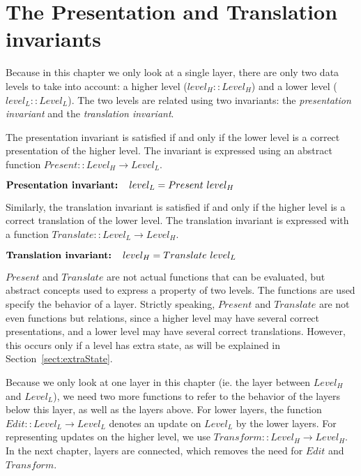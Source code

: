 %																
%																
%																
\section{The Presentation and Translation invariants}


Because in this chapter we only look at a single layer, there are only two data levels to take into account: a higher level ($level_{H} :: Level_{H}$) and a lower level ($level_{L} :: Level_{L}$). The two levels are related using two invariants: the {\em presentation invariant} and the {\em translation invariant}. 

The presentation invariant is satisfied if and only if the lower level is a correct presentation of the higher level. The invariant is expressed using an abstract function 
$Present ::  Level_{H} \rightarrow Level_{L}$.

\begin{small}\begin{math}
\text{\bf Presentation invariant:~~~} level_{L} = Present~level_{H}\\
\end{math}\end{small}

Similarly, the translation invariant is satisfied if and only if the higher level is a correct translation of the lower level. The translation invariant is expressed with a function 
$Translate ::  Level_{L} \rightarrow Level_{H}$.

\begin{small}\begin{math}
\text{\bf Translation invariant:~~~} level_{H} = Translate~level_{L}\\
\end{math}\end{small}

$Present$ and $Translate$ are not actual functions that can be evaluated, but abstract concepts used to express a property of two levels. The functions are used specify the behavior of a layer.
Strictly speaking, $Present$ and $Translate$ are not even functions but relations, since a higher level may have several correct presentations, and a lower level may have several correct translations. However, this occurs only if a level has extra state, as will be explained in Section~\ref{sect:extraState}.

Because we only look at one layer in this chapter (ie. the layer between $Level_{H}$ and $Level_{L}$), we need two more functions to refer to the behavior of the layers below this layer, as well as the layers above. For lower layers, the function $Edit :: Level_{L} \rightarrow Level_{L}$ denotes an update on $Level_{L}$ by the lower layers. For representing updates on the higher level, we use 
$Transform :: Level_{H} \rightarrow Level_{H}$. In the next chapter, layers are connected, which removes the need for $Edit$ and $Transform$.

